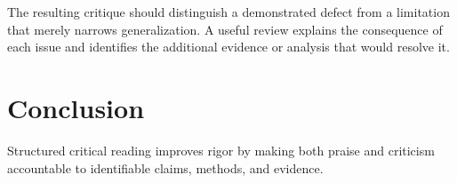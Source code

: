 \documentclass{template/ieeetj}
\begin{document}
The resulting critique should distinguish a demonstrated defect from a
limitation that merely narrows generalization. A useful review explains the
consequence of each issue and identifies the additional evidence or analysis
that would resolve it.

\section{Conclusion}

Structured critical reading improves rigor by making both praise and
criticism accountable to identifiable claims, methods, and evidence.

\end{document}
